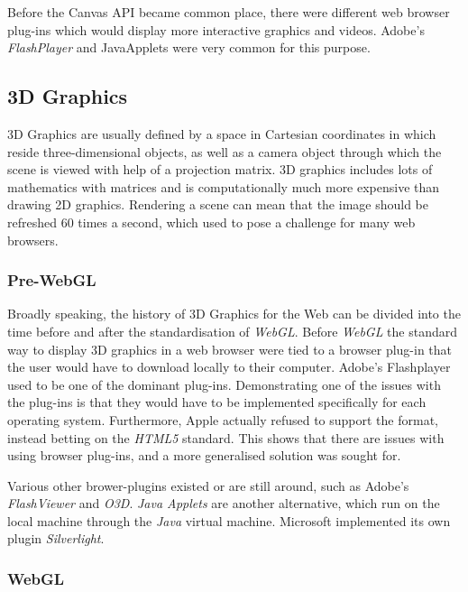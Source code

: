 \documentclass[a4paper,11pt,twoside]{article}
\begin{document}
Before the Canvas API became common place, there were different web browser plug-ins which would display more interactive graphics and videos. Adobe's \textit{FlashPlayer} and JavaApplets were very common for this purpose.



\subsection{3D Graphics}



3D Graphics are usually defined by a space in Cartesian coordinates in which reside three-dimensional objects, as well as a camera object through which the scene is viewed with help of a projection matrix. 3D graphics includes lots of mathematics with matrices and is computationally much more expensive than drawing 2D graphics. Rendering a scene can mean that the image should be refreshed 60 times a second, which used to pose a challenge for many web browsers.

\subsubsection{Pre-WebGL}

Broadly speaking, the history of 3D Graphics for the Web can be divided into the time before and after the standardisation of \textit{WebGL}. Before \textit{WebGL} the standard way to display 3D graphics in a web browser were tied to a browser plug-in that the user would have to download locally to their computer. Adobe's Flashplayer used to be one of the dominant plug-ins. Demonstrating one of the issues with the plug-ins is that they would have to be implemented specifically for each operating system. Furthermore, Apple actually refused to support the format, instead betting on the \textit{HTML5} standard. This shows that there are issues with using browser plug-ins, and a more generalised solution was sought for.

Various other brower-plugins existed or are still around, such as Adobe's \textit{FlashViewer} and \textit{O3D}. \textit{Java Applets} are another alternative, which run on the local machine through the \textit{Java} virtual machine. Microsoft implemented its own plugin \textit{Silverlight}.


\subsubsection{WebGL}
\end{document}
